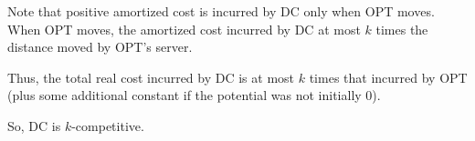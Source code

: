 \documentclass{article}
\begin{document}
Note that positive amortized cost is incurred by DC only when OPT
moves.
When OPT moves, the amortized cost incurred by DC at most $k$ times the
distance moved by OPT's server.

Thus, the total real cost incurred by DC is at most $k$ times that
incurred by OPT (plus some additional constant if the potential was not
initially 0).

So, DC is $k$-competitive.
\end{document}
